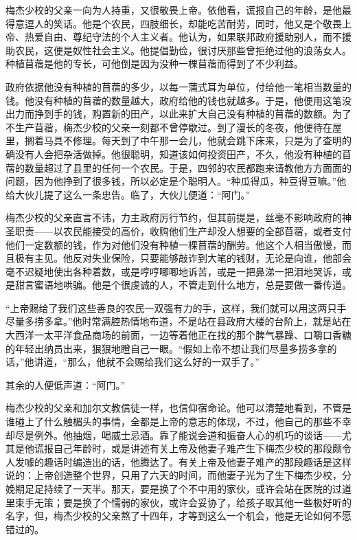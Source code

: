     梅杰少校的父亲一向为人持重，又很敬畏上帝。依他看，谎报自己的年龄，是他最得意逗人的笑话。他是个农民，四肢细长，却能吃苦耐劳，同时，他又是个敬畏上帝、热爱自由、尊纪守法的个人主义者。他认为，如果联邦政府援助别人，而不援助农民，这便是奴性社会主义。他提倡勤俭，很讨厌那些曾拒绝过他的浪荡女人。种植苜蓿是他的专长，可他倒是因为没种一棵苜蓿而得到了不少利益。

    政府依据他没有种植的苜蓿的多少，以每一蒲式耳为单位，付给他一笔相当数量的钱。他没有种植的苜蓿的数量越大，政府给他的钱也就越多。于是，他便用这笔没出力而挣到手的钱，购置新的田产，以此来扩大自己没有种植的苜蓿的数额。为了不生产苜蓿，梅杰少校的父亲一刻都不曾停歇过。到了漫长的冬夜，他便待在屋里，搁着马具不修理。每天到了中午那一会儿，他就会跳下床来，只是为了查明的确没有人会把杂活做掉。他很聪明，知道该如何投资田产，不久，他没有种植的苜蓿的数量超过了县里的任何一个农民。于是，四邻的农民都跑来请教他方方面面的问题，因为他挣到了很多钱，所以必定是个聪明人。“种瓜得瓜，种豆得豆嘛。”他给大伙儿提了这么一条忠告。临了，大伙儿便道：“阿门。”

 


    梅杰少校的父亲直言不讳，力主政府厉行节约，但其前提是，丝毫不影响政府的神圣职责——以农民能接受的高价，收购他们生产却没人想要的全部苜蓿，或者支付他们一定数额的钱，作为对他们没有种植一棵苜蓿的酬劳。他这个人相当傲慢，而且极有主见。他反对失业保险，只要能够敲诈到大笔的钱财，无论是向谁，他部会毫不迟疑地使出各种着数，或是哼哼唧唧地诉苦，或是一把鼻涕一把泪地哭诉，或是甜言蜜语地哄骗。他是个很虔诚的人，不管走到什么地方，总是要做一番传道。

    “上帝赐给了我们这些善良的农民一双强有力的手，这样，我们就可以用这两只手尽量多捞多拿。”他时常满腔热情地布道，不是站在县政府大楼的台阶上，就是站在大西洋一太平洋食品商场的前面，一边等着他正在找的那个脾气暴躁、口嚼口香糖的年轻出纳员出来，狠狠地瞪自己一眼。“假如上帝不想让我们尽量多捞多拿的话，”他讲道，“那么，他就不会赐给我们这么好的一双手了。”

    其余的人便低声道：“阿门。”

    梅杰少校的父亲和加尔文教信徒一样，也信仰宿命论。他可以清楚地看到，不管是谁碰上了什么触楣头的事情，全都是上帝的意志的体现，不过，他自己的那些不幸却尽是例外。他抽烟，喝威士忌酒。靠了能说会道和振奋人心的机巧的谈话——尤其是他谎报自己年龄时，或是讲述有关上帝及他妻子难产生下梅杰少校的那段颇令人发噱的趣话时编造出的话，他腾达了。有关上帝及他妻子难产的那段趣话是这样说的：上帝创造整个世界，只用了六天的时间，而他妻子光为了生下梅杰少校，分娩期足足持续了一天半。那天，要是换了个不中用的家伙，或许会站在医院的过道里束手无策；要是换了个懦弱的家伙，或许会妥协了，给孩子取其他一些极好听的名字，但，梅杰少校的父亲熬了十四年，才等到这么一个机会，他是无论如何不愿错过的。

